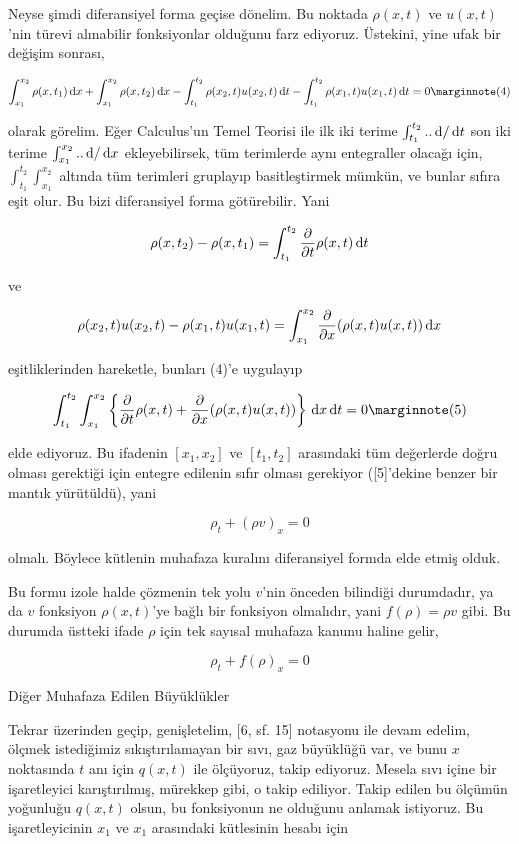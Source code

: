 \documentclass[12pt,fleqn]{article}\usepackage{../../common}
\begin{document}
Neyse şimdi diferansiyel forma geçise dönelim. Bu noktada $\rho(x,t)$ ve
$u(x,t)$'nin türevi alınabilir fonksiyonlar olduğunu farz ediyoruz. Üstekini,
yine ufak bir değişim sonrası,

$$
\int_{x_1}^{x_2} \rho(x,t_1) \ud x  +
\int_{x_1}^{x_2} \rho(x,t_2) \ud x -
\int_{t_1}^{t_2}  \rho(x_2,t) u(x_2,t) \ud t -
\int_{t_1}^{t_2} \rho(x_1,t) u(x_1,t) \ud t = 0
\mlabel{4}
$$

olarak görelim. Eğer Calculus'un Temel Teorisi ile ilk iki terime
$\int_{t_1}^{t_2} .. \,\mathrm{d} / \,\mathrm{d} t$ son iki terime $\int_{x_1}^{x_2} .. \,\mathrm{d} / \,\mathrm{d} x$
ekleyebilirsek, tüm terimlerde aynı entegraller olacağı için, 
$\int_{t_1}^{t_2} \int_{x_1}^{x_2} $ altında tüm terimleri gruplayıp
basitleştirmek mümkün, ve bunlar sıfıra eşit olur. Bu bizi diferansiyel
forma götürebilir. Yani

$$
\rho(x,t_2) - \rho(x,t_1) = \int_{t_1}^{t_2}
\frac{\partial }{\partial t} \rho(x,t) \,\mathrm{d} t
$$

ve

$$
\rho(x_2,t)u(x_2,t) - \rho(x_1,t)u(x_1,t) =
\int_{x_1}^{x_2} \frac{\partial }{\partial x} (\rho(x,t)u(x,t)) \,\mathrm{d} x
$$

eşitliklerinden hareketle, bunları (4)'e uygulayıp

$$
\int_{t_1}^{t_2} \int_{x_1}^{x_2}  \left\{
\frac{\partial }{\partial t} \rho(x,t)  +
\frac{\partial }{\partial x} (\rho(x,t)u(x,t))
\right\} \ud x \ud t = 0
\mlabel{5}
$$

elde ediyoruz. Bu ifadenin $[x_1,x_2]$ ve $[t_1,t_2]$ arasındaki tüm değerlerde
doğru olması gerektiği için entegre edilenin sıfır olması gerekiyor ([5]'dekine
benzer bir mantık yürütüldü), yani

$$
\rho_t + (\rho v)_x = 0
$$

olmalı. Böylece kütlenin muhafaza kuralını diferansiyel formda elde etmiş olduk.

Bu formu izole halde çözmenin tek yolu $v$'nin önceden bilindiği durumdadır, ya
da $v$ fonksiyon $\rho(x,t)$'ye bağlı bir fonksiyon olmalıdır, yani
$f(\rho) = \rho v$ gibi. Bu durumda üstteki ifade $\rho$ için tek sayısal
muhafaza kanunu haline gelir,

$$
\rho_t + f(\rho)_x = 0
$$

Diğer Muhafaza Edilen Büyüklükler

Tekrar üzerinden geçip, genişletelim, [6, sf. 15] notasyonu ile devam edelim,
ölçmek istediğimiz sıkıştırılamayan bir sıvı, gaz büyüklüğü var, ve bunu $x$
noktasında $t$ anı için $q(x,t)$ ile ölçüyoruz, takip ediyoruz. Mesela sıvı
içine bir işaretleyici karıştırılmış, mürekkep gibi, o takip ediliyor. Takip
edilen bu ölçümün yoğunluğu $q(x,t)$ olsun, bu fonksiyonun ne olduğunu anlamak
istiyoruz. Bu işaretleyicinin $x_1$ ve $x_1$ arasındaki kütlesinin hesabı için
\end{document}
